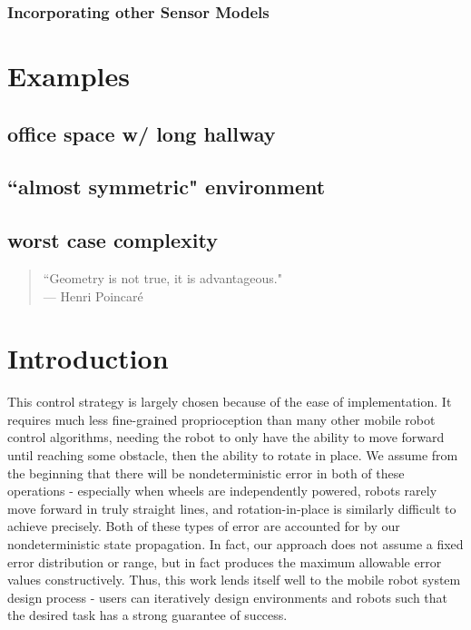 \documentclass[]{styles/svproc}  %
\begin{document}
\subsubsection{Incorporating other Sensor Models}

\section{Examples}

\subsection{office space w/ long hallway}
\subsection{``almost symmetric" environment}
\subsection{worst case complexity}

\iffalse

{\small
\begin{center}
\begin{quotation}
``Geometry is not true, it is advantageous." \\
\hfill    --- Henri Poincar\'e
\end{quotation}
\end{center}
}


\section{Introduction} 

This control strategy is largely chosen because of the ease of implementation.
It requires much less fine-grained proprioception than many other mobile robot
control algorithms, needing the robot to only have the ability to move forward
until reaching some obstacle, then the ability to rotate in place. We assume
from the beginning that there will be nondeterministic error in both of these
operations - especially when wheels are independently powered, robots rarely
move forward in truly straight lines, and rotation-in-place is similarly
difficult to achieve precisely. Both of these types of error are accounted for
by our nondeterministic state propagation. In fact, our approach does not assume
a fixed error distribution or range, but in fact produces the maximum allowable
error values constructively. Thus, this work lends itself well to the mobile
robot system design process - users can iteratively design environments and
robots such that the desired task has a strong guarantee of success.
\end{document}
